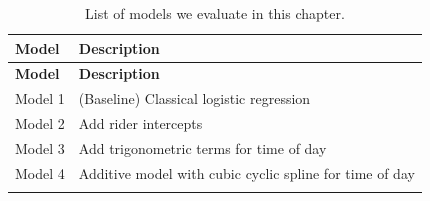 \documentclass[12pt,twoside]{reedthesis}
\begin{document}
  \begin{longtable}[c]{@{}ll@{}}
  \caption{List of models we evaluate in this chapter.
  \label{tab:models}}\tabularnewline
  \toprule
  \begin{minipage}[b]{0.13\columnwidth}\raggedright\strut
  \textbf{Model}
  \strut\end{minipage} &
  \begin{minipage}[b]{0.72\columnwidth}\raggedright\strut
  \textbf{Description}
  \strut\end{minipage}\tabularnewline
  \midrule
  \endfirsthead
  \toprule
  \begin{minipage}[b]{0.13\columnwidth}\raggedright\strut
  \textbf{Model}
  \strut\end{minipage} &
  \begin{minipage}[b]{0.72\columnwidth}\raggedright\strut
  \textbf{Description}
  \strut\end{minipage}\tabularnewline
  \midrule
  \endhead
  \begin{minipage}[t]{0.13\columnwidth}\raggedright\strut
  Model 1
  \strut\end{minipage} &
  \begin{minipage}[t]{0.72\columnwidth}\raggedright\strut
  (Baseline) Classical logistic regression
  \strut\end{minipage}\tabularnewline
  \begin{minipage}[t]{0.13\columnwidth}\raggedright\strut
  Model 2
  \strut\end{minipage} &
  \begin{minipage}[t]{0.72\columnwidth}\raggedright\strut
  Add rider intercepts
  \strut\end{minipage}\tabularnewline
  \begin{minipage}[t]{0.13\columnwidth}\raggedright\strut
  Model 3
  \strut\end{minipage} &
  \begin{minipage}[t]{0.72\columnwidth}\raggedright\strut
  Add trigonometric terms for time of day
  \strut\end{minipage}\tabularnewline
  \begin{minipage}[t]{0.13\columnwidth}\raggedright\strut
  Model 4
  \strut\end{minipage} &
  \begin{minipage}[t]{0.72\columnwidth}\raggedright\strut
  Additive model with cubic cyclic spline for time of day
  \strut\end{minipage}\tabularnewline
  \begin{minipage}[t]{0.13\columnwidth}\raggedright\strut

\end{minipage}
\end{longtable}
\end{document}
